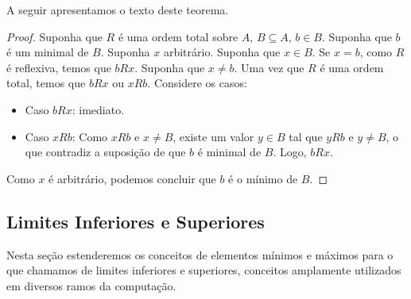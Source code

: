 A seguir apresentamos o texto deste teorema.

\begin{proof}
Suponha que $R$ é uma ordem total sobre $A$, $B\subseteq A$, $b \in
B$. Suponha que $b$ é um minimal de $B$. Suponha $x$
arbitrário. Suponha que $x\in B$. Se $x = b$, como $R$ é reflexiva,
temos que $bRx$. Suponha que $x\neq b$. Uma vez que $R$ é uma ordem
total, temos que $bRx$ ou $xRb$. Considere os casos:
\begin{itemize}
  \item Caso $bRx$: imediato.
  \item Caso $xRb$: Como $xRb$ e $x\neq B$, existe um valor $y \in B$
    tal que $yRb$ e $y\neq B$, o que contradiz a suposição de que $b$
    é minimal de $B$. Logo, $bRx$.
\end{itemize}
Como $x$ é arbitrário, podemos concluir que $b$ é o mínimo de $B$.
\end{proof}

\subsection{Limites Inferiores e Superiores}

Nesta seção estenderemos os conceitos de elementos mínimos e máximos
para o que chamamos de limites inferiores e superiores, conceitos
amplamente utilizados em diversos ramos da computação.

